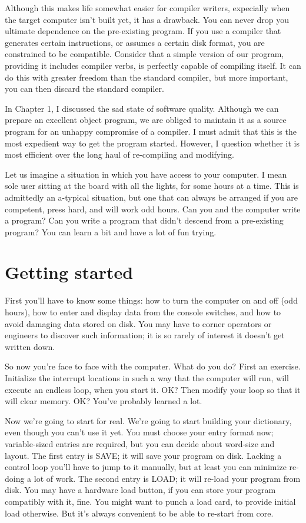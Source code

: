 \documentclass[b5paper, oneside]{book}
\begin{document}
Although this makes life somewhat easier for compiler writers, expecially when the target computer isn't built yet, it has a drawback. You can never drop you ultimate dependence on the pre-existing program. If you use a compiler that generates certain instructions, or assumes a certain disk format, you are constrained to be compatible. Consider that a simple version of our program, providing it includes compiler verbs, is perfectly capable of compiling itself. It can do this with greater freedom than the standard compiler, but more important, you can then discard the standard compiler.

In Chapter 1, I discussed the sad state of software quality. Although we can prepare an excellent object program, we are obliged to maintain it as a source program for an unhappy compromise of a compiler. I must admit that this is the most expedient way to get the program started. However, I question whether it is most efficient over the long haul of re-compiling and modifying.

Let us imagine a situation in which you have access to your computer. I mean sole user sitting at the board with all the lights, for some hours at a time. This is admittedly an a-typical situation, but one that can always be arranged if you are competent, press hard, and will work odd hours. Can you and the computer write a program? Can you write a program that didn't descend from a pre-existing program? You can learn a bit and have a lot of fun trying.

\section{Getting started}
First you'll have to know some things: how to turn the computer on and off (odd hours), how to enter and display data from the console switches, and how to avoid damaging data stored on disk. You may have to corner operators or engineers to discover such information; it is so rarely of interest it doesn't get written down.

So now you're face to face with the computer. What do you do? First an exercise. Initialize the interrupt locations in such a way that the computer will run, will execute an endless loop, when you start it. OK? Then modify your loop so that it will clear memory. OK? You've probably learned a lot.

Now we're going to start for real. We're going to start building your dictionary, even though you can't use it yet. You must choose your entry format now; variable-sized entries are required, but you can decide about word-size and layout. The first entry is SAVE; it will save your program on disk. Lacking a control loop you'll have to jump to it manually, but at least you can minimize re-doing a lot of work. The second entry is LOAD; it will re-load your program from disk. You may have a hardware load button, if you can store your program compatibly with it, fine. You might want to punch a load card, to provide initial load otherwise. But it's always convenient to be able to re-start from core.
\end{document}
